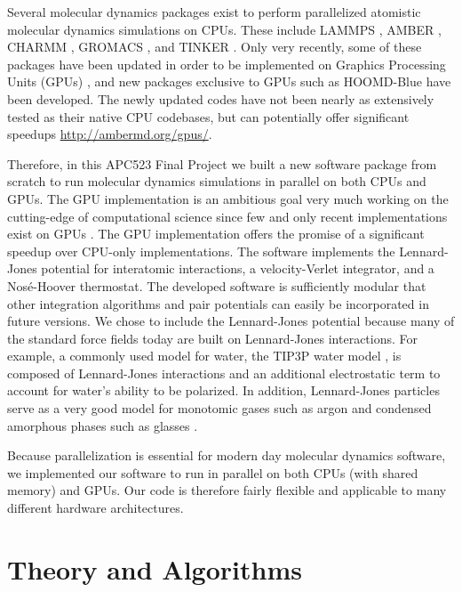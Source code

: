 \documentclass[12pt]{article}
\begin{document}
Several molecular dynamics packages exist to perform parallelized atomistic molecular dynamics simulations on CPUs.
%
These include LAMMPS \cite{Plimpton1995}, AMBER \cite{Case2010}, CHARMM \cite{MacKerell1998}, GROMACS \cite{Scott1999}, and TINKER \cite{Ponder2003}.
%
Only very recently, some of these packages have been updated in order to be implemented on Graphics Processing Units (GPUs) \cite{Brown2012,Brown2011,Gotz2012,Salomon-Ferrer2013}, and new packages exclusive to GPUs such as HOOMD-Blue\cite{Anderson2008} have been developed. %
The newly updated codes have not been nearly as extensively tested as their native CPU codebases, but can potentially offer significant speedups \url{http://ambermd.org/gpus/}.

Therefore, in this APC523 Final Project we built a new software package from scratch to run molecular dynamics simulations in parallel on both CPUs and GPUs. The GPU implementation is an ambitious goal very much working on the cutting-edge of computational science since few and only recent implementations exist on GPUs \cite{Anderson2008,Brown2012,Brown2011,Gotz2012,Salomon-Ferrer2013}.
%
The GPU implementation offers the promise of a significant speedup over CPU-only implementations.
%
The software implements the Lennard-Jones potential for interatomic interactions, a velocity-Verlet integrator, and a Nos\'{e}-Hoover thermostat. The developed software is sufficiently modular that other integration algorithms and pair potentials can easily be incorporated in future versions.
%
We chose to include the Lennard-Jones potential because many of the standard force fields \cite{Case2010,MacKerell1998,Scott1999,Kaminski2001,Arnautova2006,Khoury2013} today are built on Lennard-Jones interactions.
%
For example, a commonly used model for water, the TIP3P water model \cite{Jorgensen1983}, is composed of Lennard-Jones interactions and an additional electrostatic term to account for water's ability to be polarized.
%
In addition, Lennard-Jones particles serve as a very good model for monotomic gases such as argon \cite{Rahman1964} and condensed amorphous phases such as glasses \cite{Debenedetti2001}.

Because parallelization is essential for modern day molecular dynamics software, we implemented our software to run in parallel on both CPUs (with shared memory) and GPUs.
%
Our code is therefore fairly flexible and applicable to many different hardware architectures.

\section{Theory and Algorithms}
\end{document}
